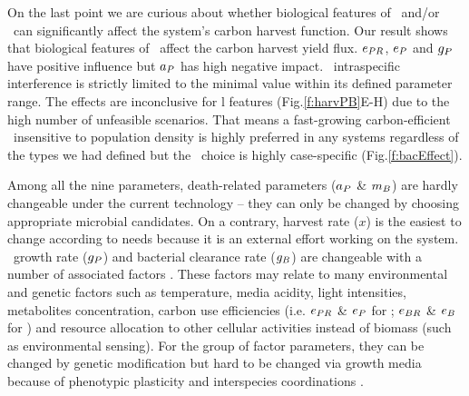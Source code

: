 \documentclass[../thesis.tex]{subfiles} %
\begin{document}
On the last point we are curious about whether biological features of \phy\ and/or \bac\ can significantly affect the system’s carbon harvest function.  Our result shows that biological features of \phy\ affect the carbon harvest yield flux.  $e_{PR}$, $e_P$ and $g_P$ have positive influence but $a_P$ has high negative impact.  \Phy\ intraspecific interference is strictly limited to the minimal value within its defined parameter range.  The effects are inconclusive for \bac l features (Fig.\ref{f:harvPB}E-H) due to the high number of unfeasible scenarios.  That means a fast-growing carbon-efficient \phy\ insensitive to population density is highly preferred in any systems regardless of the types we had defined but the \bac\ choice is highly case-specific (Fig.\ref{f:bacEffect}).

Among all the nine parameters, death-related parameters ($a_P$ \& $m_B$) are hardly changeable under the current technology -- they can only be changed by choosing appropriate microbial candidates.  On a contrary, harvest rate ($x$) is the easiest to change according to needs because it is an external effort working on the system.  \Phy\ growth rate ($g_P$) and bacterial clearance rate ($g_B$) are changeable with a number of associated factors \autocite{park2020potential}.  These factors may relate to many environmental and genetic factors such as temperature, media acidity, light intensities, metabolites concentration, carbon use efficiencies (i.e. $e_{PR}$ \& $e_P$ for \phy; $e_{BR}$ \& $e_B$ for \bac) and resource allocation to other cellular activities instead of biomass (such as environmental sensing).  For the group of factor parameters, they can be changed by genetic modification \autocite{moniruzzaman1996ethanol} but hard to be changed via growth media because of phenotypic plasticity \autocite{j1989respiration,bratbak1985phytoplankton,samejima1958heterotrophic} and interspecies coordinations \autocite{beliaev2014inference,amin2012interactions}.
\end{document}
